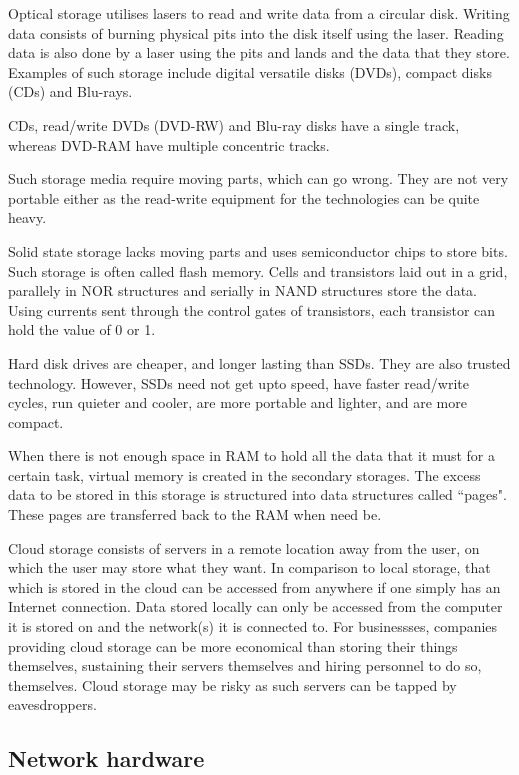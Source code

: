 Optical storage utilises lasers to read and write data from a circular disk. Writing data consists
of burning physical pits into the disk itself using the laser. Reading data is also done by a 
laser using the pits and lands and the data that they store. Examples of such storage include
digital versatile disks (DVDs), compact disks (CDs) and Blu-rays.

CDs, read/write DVDs (DVD-RW) and Blu-ray disks have a single track, whereas DVD-RAM have multiple
concentric tracks.

Such storage media require moving parts, which can go wrong. They are not very portable either as
the read-write equipment for the technologies can be quite heavy.

Solid state storage lacks moving parts and uses semiconductor chips to store bits. Such storage
is often called flash memory. Cells and transistors laid out in a grid, parallely in NOR structures
and serially in NAND structures store the data. Using currents sent through the control gates of
transistors, each transistor can hold the value of 0 or 1.

Hard disk drives are cheaper, and longer lasting than SSDs. They are also trusted technology.
However, SSDs need not get upto speed, have faster read/write cycles, run quieter and cooler,
are more portable and lighter, and are more compact.

When there is not enough space in RAM to hold all the data that it must for a certain task, virtual
memory is created in the secondary storages. The excess data to be stored in this storage is 
structured into data structures called ``pages". These pages are transferred back to the RAM
when need be.

Cloud storage consists of servers in a remote location away from the user, on which the user may
store what they want. In comparison to local storage, that which is stored in the cloud can be
accessed from anywhere if one simply has an Internet connection. Data stored locally can only
be accessed from the computer it is stored on and the network(s) it is connected to. For 
businessses, companies providing cloud storage can be more economical than storing their things
themselves, sustaining their servers themselves and hiring personnel to do so, themselves. Cloud
storage may be risky as such servers can be tapped by eavesdroppers.

\subsection{Network hardware}

